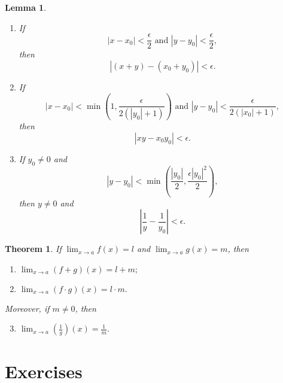 \documentclass{article}
\newtheorem{theorem}{Theorem}
\newtheorem{lemma}{Lemma}
\begin{document}
\begin{lemma}
  \begin{enumerate}
    \item If \[
        |x - x_0| < \frac{\epsilon}{2} \text{ and } |y - y_0| <
          \frac{\epsilon}{2},
      \] then \[
        |(x + y) - (x_0 + y_0)| < \epsilon.
      \]
    \item If \[
        |x - x_0| < \min\left( 1, \frac{\epsilon}{2(|y_0| + 1)} \right)
        \text{ and } |y - y_0| < \frac{\epsilon}{2(|x_0| + 1)},
      \] then \[
        |xy - x_0y_0| < \epsilon.
      \]
    \item If $y_0 \neq 0$ and \[
        |y - y_0| < \min\left(
          \frac{|y_0|}{2},
          \frac{\epsilon|y_0|^2}{2}
        \right),
      \] then $y \neq 0$ and \[
        \left| \frac{1}{y} - \frac{1}{y_0} \right| < \epsilon.
      \]
  \end{enumerate}
\end{lemma}

\begin{theorem}
  If $\lim_{x \to a}f(x) = l$ and $\lim_{x \to a}g(x) = m$, then
  \begin{enumerate}
    \item $\lim_{x \to a}(f + g)(x) = l + m;$
    \item $\lim_{x \to a}(f \cdot g)(x) = l \cdot m.$
  \end{enumerate}
  Moreover, if $m \neq 0$, then
  \begin{enumerate}
    \setcounter{enumi}{2}
    \item $\lim_{x \to a}\left(\frac{1}{g}\right)(x) = \frac{1}{m}.$
  \end{enumerate}
\end{theorem}

\section*{Exercises}
\end{document}
